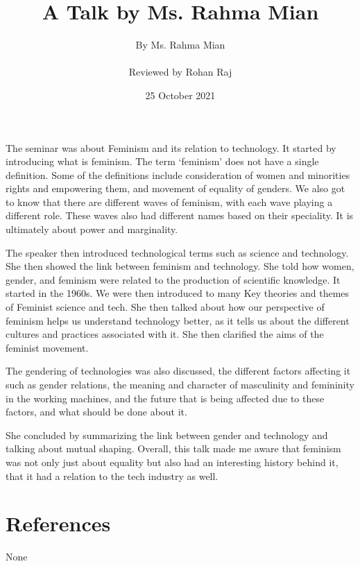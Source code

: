 \documentclass{article}
\title{A Talk by Ms. Rahma Mian} %
\author{By Ms. Rahma Mian \\ \\ Reviewed by Rohan Raj} %
\date{25 October 2021} %
\begin{document}
\maketitle
The seminar was about Feminism and its relation to technology. It started by introducing what is feminism. The term ‘feminism’ does not have a single definition. Some of the definitions include consideration of women and minorities rights and empowering them, and movement of equality of genders. We also got to know that there are different waves of feminism, with each wave playing a different role. These waves also had different names based on their speciality. It is ultimately about power and marginality.
\par
The speaker then introduced technological terms such as science and technology. She then showed the link between feminism and technology. She told how women, gender, and feminism were related to the production of scientific knowledge. It started in the 1960s. We were then introduced to many Key theories and themes of Feminist science and tech. She then talked about how our perspective of feminism helps us understand technology better, as it tells us about the different cultures and practices associated with it. She then clarified the aims of the feminist movement.
\par
The gendering of technologies was also discussed, the different factors affecting it such as gender relations, the meaning and character of masculinity and femininity in the working machines, and the future that is being affected due to these factors, and what should be done about it.
\par
She concluded by summarizing the link between gender and technology and talking about mutual shaping. Overall, this talk made me aware that feminism was not only just about equality but also had an interesting history behind it, that it had a relation to the tech industry as well.



\section*{References}
None 
\end{document}
